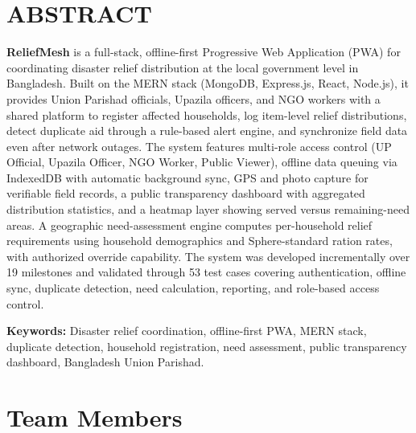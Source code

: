 \documentclass[11pt,a4paper]{report}
\renewcommand{\headrulewidth}{0.4pt}
\renewcommand{\headrulewidth}{0pt}
\renewcommand{\headrulewidth}{0pt}
\renewcommand{\headrulewidth}{0pt}
\begin{document}
\clearpage

\chapter*{ABSTRACT}

\textbf{ReliefMesh} is a full-stack, offline-first Progressive Web Application (PWA) for coordinating disaster relief distribution at the local government level in Bangladesh. Built on the MERN stack (MongoDB, Express.js, React, Node.js), it provides Union Parishad officials, Upazila officers, and NGO workers with a shared platform to register affected households, log item-level relief distributions, detect duplicate aid through a rule-based alert engine, and synchronize field data even after network outages. The system features multi-role access control (UP Official, Upazila Officer, NGO Worker, Public Viewer), offline data queuing via IndexedDB with automatic background sync, GPS and photo capture for verifiable field records, a public transparency dashboard with aggregated distribution statistics, and a heatmap layer showing served versus remaining-need areas. A geographic need-assessment engine computes per-household relief requirements using household demographics and Sphere-standard ration rates, with authorized override capability. The system was developed incrementally over 19 milestones and validated through 53 test cases covering authentication, offline sync, duplicate detection, need calculation, reporting, and role-based access control.

\medskip
\noindent\textbf{Keywords:} Disaster relief coordination, offline-first PWA, MERN stack, duplicate detection, household registration, need assessment, public transparency dashboard, Bangladesh Union Parishad.

\clearpage
{}
\pagestyle{fancy}
\fancyhf{}
\renewcommand{\headrulewidth}{0pt}
\fancyfoot[R]{\thepage/\pageref{LastPage}}

\chapter*{Team Members}
\thispagestyle{plain}
\end{document}

